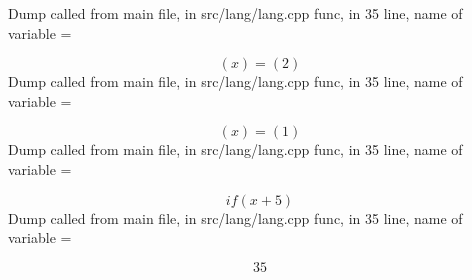 \documentclass{article}
\begin{document}
Dump called from main file, in src/lang/lang.cpp func, in 35 line, name of variable = 


$$
(x) = (2)
$$
Dump called from main file, in src/lang/lang.cpp func, in 35 line, name of variable = 


$$
(x) = (1)
$$
Dump called from main file, in src/lang/lang.cpp func, in 35 line, name of variable = 


$$
 if (x + 5)
$$
Dump called from main file, in src/lang/lang.cpp func, in 35 line, name of variable = 


$$
35
$$
\end{document}
